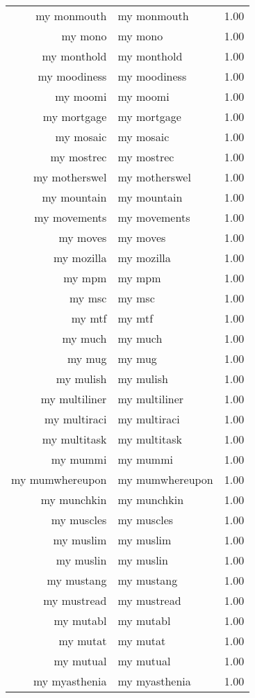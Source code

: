 \begin{table}[ht]
\begin{tabular}{rlr}
  my monmouth & my monmouth & 1.00 \\ 
  my mono & my mono & 1.00 \\ 
  my monthold & my monthold & 1.00 \\ 
  my moodiness & my moodiness & 1.00 \\ 
  my moomi & my moomi & 1.00 \\ 
  my mortgage & my mortgage & 1.00 \\ 
  my mosaic & my mosaic & 1.00 \\ 
  my mostrec & my mostrec & 1.00 \\ 
  my motherswel & my motherswel & 1.00 \\ 
  my mountain & my mountain & 1.00 \\ 
  my movements & my movements & 1.00 \\ 
  my moves & my moves & 1.00 \\ 
  my mozilla & my mozilla & 1.00 \\ 
  my mpm & my mpm & 1.00 \\ 
  my msc & my msc & 1.00 \\ 
  my mtf & my mtf & 1.00 \\ 
  my much & my much & 1.00 \\ 
  my mug & my mug & 1.00 \\ 
  my mulish & my mulish & 1.00 \\ 
  my multiliner & my multiliner & 1.00 \\ 
  my multiraci & my multiraci & 1.00 \\ 
  my multitask & my multitask & 1.00 \\ 
  my mummi & my mummi & 1.00 \\ 
  my mumwhereupon & my mumwhereupon & 1.00 \\ 
  my munchkin & my munchkin & 1.00 \\ 
  my muscles & my muscles & 1.00 \\ 
  my muslim & my muslim & 1.00 \\ 
  my muslin & my muslin & 1.00 \\ 
  my mustang & my mustang & 1.00 \\ 
  my mustread & my mustread & 1.00 \\ 
  my mutabl & my mutabl & 1.00 \\ 
  my mutat & my mutat & 1.00 \\ 
  my mutual & my mutual & 1.00 \\ 
  my myasthenia & my myasthenia & 1.00 \\ 

\end{tabular}
\end{table}
